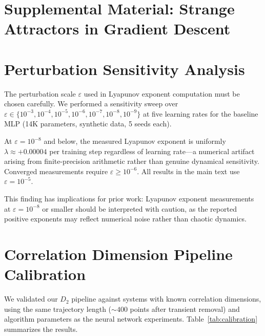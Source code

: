 \documentclass[aps,prl,twocolumn,superscriptaddress,floatfix]{revtex4-2}
\begin{document}


\clearpage
\onecolumngrid
\appendix

\section*{Supplemental Material: Strange Attractors in Gradient Descent}
\setcounter{section}{0}
\setcounter{figure}{0}
\setcounter{table}{0}
\renewcommand{\thesection}{S\arabic{section}}
\renewcommand{\thefigure}{S\arabic{figure}}
\renewcommand{\thetable}{S\Roman{table}}

\section{Perturbation Sensitivity Analysis}

The perturbation scale $\varepsilon$ used in Lyapunov exponent computation must be chosen carefully. We performed a sensitivity sweep over $\varepsilon \in \{10^{-3}, 10^{-4}, 10^{-5}, 10^{-6}, 10^{-7}, 10^{-8}, 10^{-9}\}$ at five learning rates for the baseline MLP (14K parameters, synthetic data, 5 seeds each).

At $\varepsilon = 10^{-8}$ and below, the measured Lyapunov exponent is uniformly $\lambda \approx +0.00004$ per training step regardless of learning rate---a numerical artifact arising from finite-precision arithmetic rather than genuine dynamical sensitivity. Converged measurements require $\varepsilon \geq 10^{-6}$. All results in the main text use $\varepsilon = 10^{-5}$.

This finding has implications for prior work: Lyapunov exponent measurements at $\varepsilon = 10^{-8}$ or smaller should be interpreted with caution, as the reported positive exponents may reflect numerical noise rather than chaotic dynamics.

\section{Correlation Dimension Pipeline Calibration}

We validated our $D_2$ pipeline against systems with known correlation dimensions, using the same trajectory length (${\sim}400$ points after transient removal) and algorithm parameters as the neural network experiments. Table~\ref{tab:calibration} summarizes the results.
\end{document}
